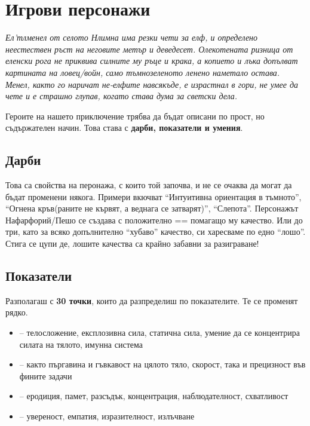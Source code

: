 \section{Игрови персонажи}
\emph{Ел'тлменел от селото Нлимна има резки чети за елф, и определено неестествен ръст на неговите метър и деведесет.
Олекотената ризница от еленски рога не приквива силните му ръце и крака, а копието и лъка допълват картината на ловец/войн, само тъмнозеленото ленено наметало остава.
Менел, както го наричат не-елфите навсякъде, е израстнал в гори, не умее да чете и е страшно глупав, когато става дума за светски дела.}

Героите на нашето приключение трябва да бъдат описани по прост, но съдържателен начин.
Това става с \textbf{дарби, показатели и умения}.

\subsection{Дарби}
Това са свойства на перонажа, с които той започва, и не се очаква да могат да бъдат променени някога.
Примери вкючват “Интуитивна ориентация в тъмното”, “Огнена кръв(раните не кървят, а веднага се затварят)”, “Слепота”.
Персонажът Нафарфорий/Пешо се създава с { положително} == помагащо му качество.
Или до { три}, като за всяко допълнително “хубаво” качество, си харесваме по едно “лошо”. Стига се цупи де, лошите качества са крайно забавни за разиграване!

\subsection{Показатели}
Разполагаш с \textbf{30 точки}, които да разпределиш по показателите. Те се променят рядко.
\begin{itemize}
\item {} – телосложение, експлозивна сила, статична сила, умение да се концентрира силата на тялото, имунна система
\item {} – както пъргавина и гъвкавост на цялото тяло, скорост, така и прецизност във фините задачи
\item {} – еродиция, памет, разсъдък, концентрация, наблюдателност, схватливост
\item {} – увереност, емпатия, изразителност, излъчване
\end{itemize}


